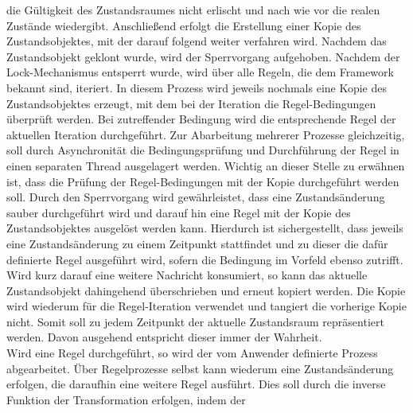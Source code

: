         die Gültigkeit des Zustandsraumes nicht erlischt und nach wie vor die realen Zustände wiedergibt. Anschließend erfolgt die 
        Erstellung einer Kopie des Zustandsobjektes, mit der 
        darauf folgend weiter verfahren wird. Nachdem das Zustandsobjekt geklont wurde, wird der Sperrvorgang aufgehoben. 
        Nachdem der Lock-Mechanismus entsperrt wurde, wird über alle Regeln, die dem Framework bekannt sind, iteriert. In diesem Prozess 
        wird jeweils nochmals eine Kopie des Zustandsobjektes erzeugt, mit dem bei der Iteration die Regel-Bedingungen überprüft werden. 
        Bei zutreffender Bedingung wird die entsprechende Regel der aktuellen Iteration durchgeführt. Zur Abarbeitung mehrerer Prozesse 
        gleichzeitig, soll durch Asynchronität die Bedingungsprüfung und Durchführung der Regel in einen separaten Thread ausgelagert werden. 
        Wichtig an dieser Stelle zu 
        erwähnen ist, dass die Prüfung der Regel-Bedingungen mit der Kopie durchgeführt werden soll.
        Durch den Sperrvorgang wird gewährleistet, dass eine Zustandsänderung sauber durchgeführt wird und darauf hin eine Regel mit der 
        Kopie des Zustandsobjektes ausgelöst werden kann. Hierdurch ist sichergestellt, dass jeweils eine Zustandsänderung zu einem 
        Zeitpunkt stattfindet und zu dieser die dafür definierte Regel ausgeführt wird, sofern die Bedingung im Vorfeld ebenso zutrifft. 
        \\
        Wird kurz darauf eine weitere Nachricht konsumiert, so kann das aktuelle Zustandsobjekt dahingehend überschrieben und erneut 
        kopiert werden. Die Kopie wird wiederum für die Regel-Iteration verwendet und tangiert die vorherige Kopie nicht. Somit soll 
        zu jedem Zeitpunkt der aktuelle Zustandsraum repräsentiert werden. Davon ausgehend entspricht dieser immer der Wahrheit.
        \\
        \linebreak
        Wird eine Regel durchgeführt, so wird der vom Anwender definierte Prozess abgearbeitet. Über Regelprozesse selbst kann wiederum eine 
        Zustandsänderung erfolgen, die daraufhin eine weitere Regel ausführt. Dies soll durch die inverse Funktion der Transformation erfolgen, indem der 

